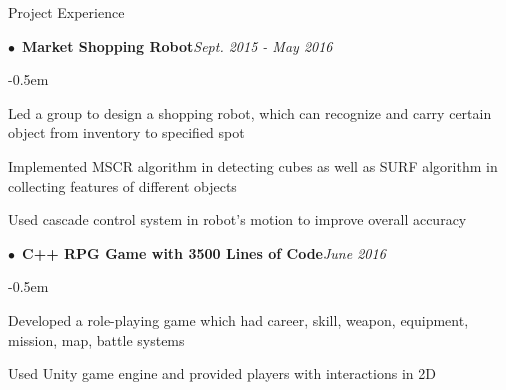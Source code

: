 \documentclass{resume} %
\begin{document}
\begin{rSection}{Project Experience}
\begin{spacing}{0.4}
$\bullet$~{\bf Market Shopping Robot}\hfill{\em Sept. 2015 - May 2016}\smallskip\\
\end{spacing}
\begin{list}{--}{\leftmargin=1em}
	\itemsep -0.5em \vspace{-0.5em}
\item Led a group to design a shopping robot, which can recognize and carry certain object from inventory to specified spot
\item Implemented MSCR algorithm in detecting cubes as well as SURF algorithm in collecting features of different objects
\item Used cascade control system in robot’s motion to improve overall accuracy

\end{list}

\begin{spacing}{0.4}
$\bullet$~{\bf C++ RPG Game with 3500 Lines of Code}\hfill{\em June 2016}\smallskip\\
\end{spacing}
\begin{list}{--}{\leftmargin=1em}
	\itemsep -0.5em \vspace{-0.5em}
\item Developed a role-playing game which had career, skill, weapon, equipment, mission, map, battle systems
\item Used Unity game engine and provided players with interactions in 2D

\end{list}
	

\end{rSection}
\end{document}
